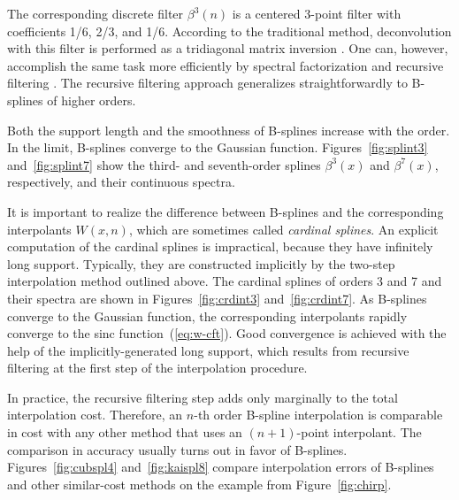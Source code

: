 The corresponding discrete filter $\beta^3(n)$ is a centered 3-point
filter with coefficients 1/6, 2/3, and 1/6. According to the
traditional method, deconvolution with this filter is performed as a
tridiagonal matrix inversion \cite[]{deBoor}. One can, however,
accomplish the same task more efficiently by spectral factorization
and recursive filtering \cite[]{unser1}. The recursive filtering
approach generalizes straightforwardly to B-splines of higher orders.
\par
Both the support length and the smoothness of B-splines increase with
the order. In the limit, B-splines converge to the Gaussian function.
Figures~\ref{fig:splint3} and~\ref{fig:splint7} show the third- and
seventh-order splines $\beta^3(x)$ and $\beta^7(x)$, respectively, and
their continuous spectra.


\par
It is important to realize the difference between B-splines and the
corresponding interpolants $W(x,n)$, which are sometimes called
\emph{cardinal splines}.  An explicit computation of the cardinal
splines is impractical, because they have infinitely long support.
Typically, they are constructed implicitly by the two-step
interpolation method outlined above. The cardinal splines of orders 3
and 7 and their spectra are shown in Figures~\ref{fig:crdint3}
and~\ref{fig:crdint7}. As B-splines converge to the Gaussian function,
the corresponding interpolants rapidly converge to the sinc
function~(\ref{eq:w-cft}). Good convergence is achieved with the help
of the implicitly-generated long support, which results from
recursive filtering at the first step of the interpolation procedure.




In practice, the recursive filtering step adds only marginally to the
total interpolation cost. Therefore, an $n$-th order B-spline
interpolation is comparable in cost with any other method that uses an
$(n+1)$-point interpolant. The comparison in accuracy usually turns
out in favor of B-splines. Figures~\ref{fig:cubspl4}
and~\ref{fig:kaispl8} compare interpolation errors of B-splines and
other similar-cost methods on the example from Figure~\ref{fig:chirp}.

